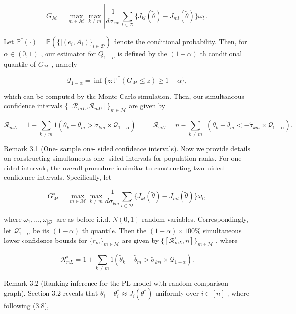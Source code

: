 \[
G_{\mathcal{M}} = \max_{m \in \mathcal{M}} \max_{k \neq m} \left| \frac{1}{d \sigma_{km}} \sum_{l \in \mathcal{D}} \{J_{kl}(\widetilde{\theta}) - J_{ml}(\widetilde{\theta})\} \omega_{l} \right|. \tag{3.14}
\]

Let
\(\mathbb{P}^{*}(\cdot) = \mathbb{P}(\{|(e_{i}, A_{i})\}_{i \in \mathcal{D}})\)
denote the conditional probability. Then, for \(\alpha \in (0,1)\) , our
estimator for \(Q_{1 - \alpha}\) is defined by the \((1 - \alpha)\) th
conditional quantile of \(G_{\mathcal{M}}\) , namely

\[
\mathcal{Q}_{1 - \alpha} = \inf \{z: \mathbb{P}^{*}(G_{\mathcal{M}} \leq z) \geq 1 - \alpha \} ,
\]

which can be computed by the Monte Carlo simulation. Then, our
simultaneous confidence intervals
\(\{[\mathcal{R}_{mL}, \mathcal{R}_{mU}] \}_{m \in \mathcal{M}}\) are
given by

\[
\mathcal{R}_{mL} = 1 + \sum_{k \neq m} 1 \left(\widetilde{\theta}_{k} - \widetilde{\theta}_{m} > \widetilde{\sigma}_{km} \times \mathcal{Q}_{1 - \alpha}\right), \qquad \mathcal{R}_{mU} = n - \sum_{k \neq m} 1 \left(\widetilde{\theta}_{k} - \widetilde{\theta}_{m} < -\widetilde{\sigma}_{km} \times \mathcal{Q}_{1 - \alpha}\right).
\]

Remark 3.1 (One- sample one- sided confidence intervals). Now we provide
details on constructing simultaneous one- sided intervals for population
ranks. For one- sided intervals, the overall procedure is similar to
constructing two- sided confidence intervals. Specifically, let

\[
G_{\mathcal{M}}^{\circ} = \max_{m \in \mathcal{M}} \max_{k \neq m} \frac{1}{d \sigma_{km}} \sum_{l \in \mathcal{D}} \{J_{kl}(\widetilde{\theta}) - J_{ml}(\widetilde{\theta})\} \omega_{l}, \tag{3.16}
\]

where \(\omega_{1}, \ldots , \omega_{|\mathcal{D}|}\) are as before
i.i.d. \(N(0,1)\) random variables. Correspondingly, let
\(\mathcal{Q}_{1 - \alpha}^{\circ}\) be its \((1 - \alpha)\) th
quantile. Then the \((1 - \alpha) \times 100\%\) simultaneous lower
confidence bounds for \(\{r_{m}\}_{m \in \mathcal{M}}\) are given by
\(\{[\mathcal{R}_{mL}^{ \circ }, n] \}_{m \in \mathcal{M}}\) , where

\[
\mathcal{R}_{mL}^{\circ} = 1 + \sum_{k \neq m} 1 \left(\widetilde{\theta}_{k} - \widetilde{\theta}_{m} > \widetilde{\sigma}_{km} \times \mathcal{Q}_{1 - \alpha}^{\circ}\right). \tag{3.17}
\]

Remark 3.2 (Ranking inference for the PL model with random comparison
graph). Section 3.2 reveals that
\(\widetilde{\theta}_{i} - \theta_{i}^{*} \approx J_{i}(\theta^{*})\)
uniformly over \(i \in [n]\) , where following (3.8),

